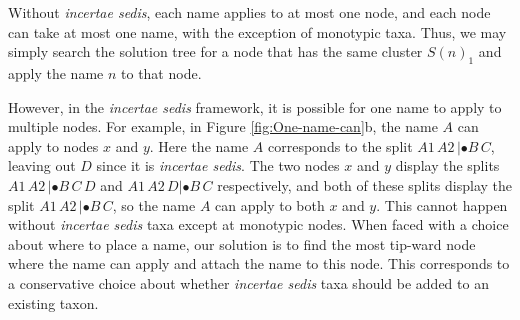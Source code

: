 \documentclass[english]{article}
\begin{document}
Without \emph{incertae sedis}, each name applies to at most one node,
and each node can take at most one name, with the exception of
monotypic taxa.
Thus, we may simply search the solution tree for a
node that has the same cluster $S(n)_{1}$ and apply the name $n$ to
that node.

However, in the \emph{incertae sedis} framework, it is possible for
one name to apply to multiple nodes.
For example, in Figure \ref{fig:One-name-can}b, 
the name $A$ can apply to nodes $x$ and $y$.
Here the
name $A$ corresponds to the split $A1\,A2\,|\bullet B\,C$, leaving out
$D$ since it is \emph{incertae sedis}.
The two nodes $x$ and $y$
display the splits $A1\,A2\,|\bullet B\,C\,D$ and $A1\,A2\,D|\bullet
B\,C$ respectively, and both of these splits display the split
$A1\,A2\,|\bullet B\,C$, so the name $A$ can apply to both $x$ and
$y$.
This cannot happen without\emph{ incertae sedis} taxa except at
monotypic nodes.
When faced with a choice about where to place a name,
our solution is to find the most tip-ward node where the name can
apply and attach the name to this node.
This corresponds to a
conservative choice about whether \emph{incertae sedis} taxa should be
added to an existing taxon.
\end{document}
